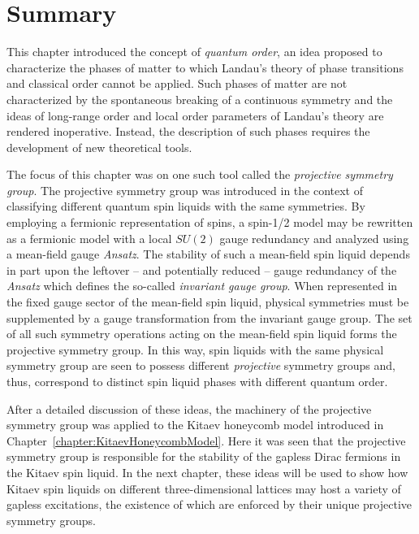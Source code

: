 %
%
\section{Summary}
\label{section:chapter04_Summary}
%
%
This chapter introduced the concept of \textit{quantum order}, an idea proposed to characterize the phases of matter to which Landau's theory of phase transitions and classical order cannot be applied.
Such phases of matter are not characterized by the spontaneous breaking of a continuous symmetry and the ideas of long-range order and local order parameters of Landau's theory are rendered inoperative.
Instead, the description of such phases requires the development of new theoretical tools.

The focus of this chapter was on one such tool called the \textit{projective symmetry group}.
The projective symmetry group was introduced in the context of classifying different quantum spin liquids with the same symmetries.
By employing a fermionic representation of spins, a spin-1/2 model may be rewritten as a fermionic model with a local $SU(2)$ gauge redundancy and analyzed using a mean-field gauge \textit{Ansatz}.
The stability of such a mean-field spin liquid depends in part upon the leftover -- and potentially reduced -- gauge redundancy of the \textit{Ansatz} which defines the so-called \textit{invariant gauge group}.
When represented in the fixed gauge sector of the mean-field spin liquid, physical symmetries must be supplemented by a gauge transformation from the invariant gauge group.
The set of all such symmetry operations acting on the mean-field spin liquid forms the projective symmetry group.
In this way, spin liquids with the same physical symmetry group are seen to possess different \textit{projective} symmetry groups and, thus, correspond to distinct spin liquid phases with different quantum order.

After a detailed discussion of these ideas, the machinery of the projective symmetry group was applied to the Kitaev honeycomb model introduced in Chapter~\ref{chapter:KitaevHoneycombModel}.
Here it was seen that the projective symmetry group is responsible for the stability of the gapless Dirac fermions in the Kitaev spin liquid.
In the next chapter, these ideas will be used to show how Kitaev spin liquids on different three-dimensional lattices may host a variety of gapless excitations, the existence of which are enforced by their unique projective symmetry groups.